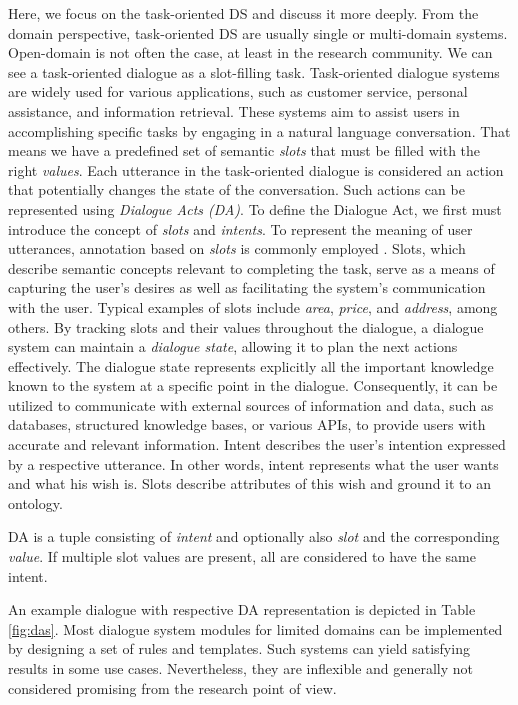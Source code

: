 Here, we focus on the task-oriented DS and discuss it more deeply.
From the domain perspective, task-oriented DS are usually single or multi-domain systems.
Open-domain is not often the case, at least in the research community.
We can see a task-oriented dialogue as a slot-filling task.
Task-oriented dialogue systems are widely used for various applications, such as customer service, personal assistance, and information retrieval. These systems aim to assist users in accomplishing specific tasks by engaging in a natural language conversation. 
That means we have a predefined set of semantic \textit{slots} that must be filled with the right \textit{values}.
Each utterance in the task-oriented dialogue is considered an action that potentially changes the state of the conversation.
Such actions can be represented using \textit{Dialogue Acts (DA)}\cite{core1997coding}.
To define the Dialogue Act, we first must introduce the concept of \emph{slots} and \emph{intents}.
To represent the meaning of user utterances, annotation based on \emph{slots} is commonly employed \cite{young_pomdp-based_2013}. Slots, which describe semantic concepts relevant to completing the task, serve as a means of capturing the user's desires as well as facilitating the system's communication with the user. Typical examples of slots include \emph{area}, \emph{price}, and \emph{address}, among others. By tracking slots and their values throughout the dialogue, a dialogue system can maintain a \emph{dialogue state}, allowing it to plan the next actions \cite{williams2013dialog} effectively. The dialogue state represents explicitly all the important knowledge known to the system at a specific point in the dialogue. Consequently, it can be utilized to communicate with external sources of information and data, such as databases, structured knowledge bases, or various APIs, to provide users with accurate and relevant information.
Intent describes the user's intention expressed by a respective utterance.
In other words, intent represents what the user wants and what his wish is.
Slots describe attributes of this wish and ground it to an ontology.

DA is a tuple consisting of \textit{intent} and optionally also \textit{slot} and the corresponding \textit{value}.
If multiple slot values are present, all are considered to have the same intent.

An example dialogue with respective DA representation is depicted in Table \ref{fig:das}.
Most dialogue system modules for limited domains can be implemented by designing a set of rules and templates.
Such systems can yield satisfying results in some use cases.
Nevertheless, they are inflexible and generally not considered promising from the research point of view.

